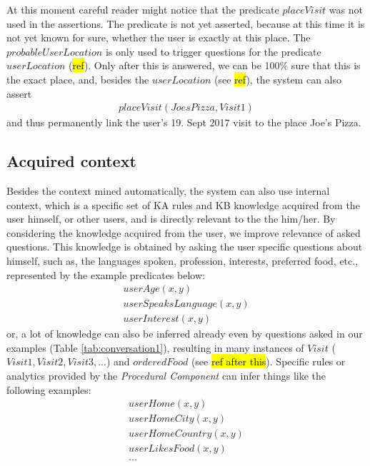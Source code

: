 At this moment careful reader might notice that the predicate $placeVisit$ was
not used in the assertions. The predicate is not yet asserted, because at 
this time it is not yet known for sure, whether the user is exactly at this 
place. The $probableUserLocation$ is only used to trigger questions for the
predicate $userLocation$ (\hl{ref}). Only after this is answered, we can be
100\% sure that this is the exact place, and, besides the $userLocation$ (see
\hl{ref}), the system can also assert
\begin{equation}\label{as:placeVisit}
\begin{gathered}
	placeVisit(JoesPizza,Visit1)
\end{gathered}
\end{equation}
and thus permanently link the user's 19. Sept 2017 visit to the place 
Joe's Pizza.

\subsection{Acquired context}
\label{section:acquiredContext}
Besides the context mined automatically, the system can also use internal 
context, which is a specific set of KA rules and KB knowledge acquired from
the user himself, or other users, and is directly relevant to the the him/her. 
By considering the knowledge acquired from the user, we improve relevance of 
asked questions. 
This knowledge is obtained by asking the user specific questions about himself,
such as, the languages spoken, profession, interests, preferred food, etc.,
represented by the example predicates below:
\begin{equation*}
\begin{gathered}
	userAge(x,y) \\	
	userSpeaksLanguage(x,y) \\
	userInterest(x,y)
\end{gathered}
\end{equation*}
or, a lot of knowledge can also be inferred already even by questions asked
in our examples (Table \ref{tab:conversation1}), resulting in many instances of
$Visit$ ($Visit1,Visit2,Visit3,...$) and $orderedFood$ (see \hl{ref after this}).
Specific rules or analytics provided by the \emph{Procedural Component} can
infer things like the following examples:
\begin{equation*}
\begin{gathered}
	userHome(x,y) \\
	userHomeCity(x,y) \\
	userHomeCountry(x,y) \\
	userLikesFood(x,y) \\
	...
\end{gathered}
\end{equation*}

